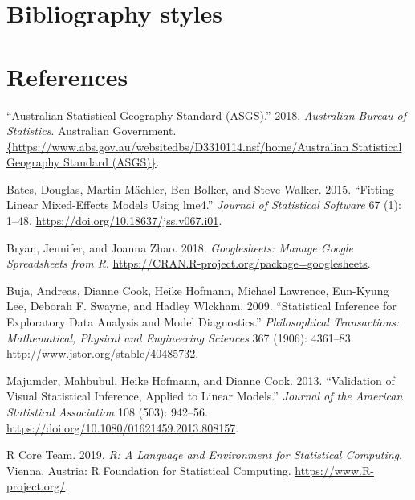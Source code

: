 \documentclass[conference,final,]{IEEEtran}
\begin{document}
\hypertarget{bibliography-styles}{%
\section{Bibliography styles}\label{bibliography-styles}}

\newpage

\hypertarget{references}{%
\section{References}\label{references}}

\hypertarget{refs}{}
\leavevmode\hypertarget{ref-abs2016}{}%
``Australian Statistical Geography Standard (ASGS).'' 2018.
\emph{Australian Bureau of Statistics}. Australian Government.
\href{\%7Bhttps://www.abs.gov.au/websitedbs/D3310114.nsf/home/Australian\%20\%20\%20Statistical\%20Geography\%20Standard\%20(ASGS)\%7D}{\{https://www.abs.gov.au/websitedbs/D3310114.nsf/home/Australian   Statistical Geography Standard (ASGS)\}}.

\leavevmode\hypertarget{ref-lme4}{}%
Bates, Douglas, Martin Mächler, Ben Bolker, and Steve Walker. 2015.
``Fitting Linear Mixed-Effects Models Using lme4.'' \emph{Journal of
Statistical Software} 67 (1): 1--48.
\url{https://doi.org/10.18637/jss.v067.i01}.

\leavevmode\hypertarget{ref-sheets}{}%
Bryan, Jennifer, and Joanna Zhao. 2018. \emph{Googlesheets: Manage
Google Spreadsheets from R}.
\url{https://CRAN.R-project.org/package=googlesheets}.

\leavevmode\hypertarget{ref-SIEDAMD}{}%
Buja, Andreas, Dianne Cook, Heike Hofmann, Michael Lawrence, Eun-Kyung
Lee, Deborah F. Swayne, and Hadley Wlckham. 2009. ``Statistical
Inference for Exploratory Data Analysis and Model Diagnostics.''
\emph{Philosophical Transactions: Mathematical, Physical and Engineering
Sciences} 367 (1906): 4361--83.
\url{http://www.jstor.org/stable/40485732}.

\leavevmode\hypertarget{ref-VVSIALM}{}%
Majumder, Mahbubul, Heike Hofmann, and Dianne Cook. 2013. ``Validation
of Visual Statistical Inference, Applied to Linear Models.''
\emph{Journal of the American Statistical Association} 108 (503):
942--56. \url{https://doi.org/10.1080/01621459.2013.808157}.

\leavevmode\hypertarget{ref-RCore}{}%
R Core Team. 2019. \emph{R: A Language and Environment for Statistical
Computing}. Vienna, Austria: R Foundation for Statistical Computing.
\url{https://www.R-project.org/}.
\end{document}
